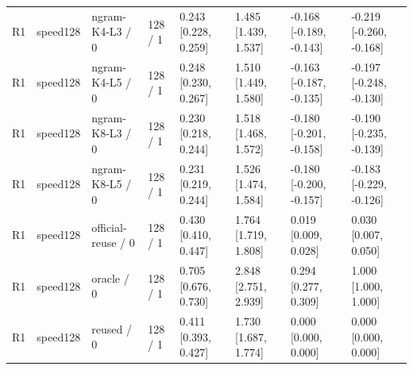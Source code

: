 \begin{tabular}{llllllll}
R1 & speed128 & ngram-K4-L3 / 0 & 128 / 1 & 0.243 [0.228, 0.259] & 1.485 [1.439, 1.537] & -0.168 [-0.189, -0.143] & -0.219 [-0.260, -0.168] \\
R1 & speed128 & ngram-K4-L5 / 0 & 128 / 1 & 0.248 [0.230, 0.267] & 1.510 [1.449, 1.580] & -0.163 [-0.187, -0.135] & -0.197 [-0.248, -0.130] \\
R1 & speed128 & ngram-K8-L3 / 0 & 128 / 1 & 0.230 [0.218, 0.244] & 1.518 [1.468, 1.572] & -0.180 [-0.201, -0.158] & -0.190 [-0.235, -0.139] \\
R1 & speed128 & ngram-K8-L5 / 0 & 128 / 1 & 0.231 [0.219, 0.244] & 1.526 [1.474, 1.584] & -0.180 [-0.200, -0.157] & -0.183 [-0.229, -0.126] \\
R1 & speed128 & official-reuse / 0 & 128 / 1 & 0.430 [0.410, 0.447] & 1.764 [1.719, 1.808] & 0.019 [0.009, 0.028] & 0.030 [0.007, 0.050] \\
R1 & speed128 & oracle / 0 & 128 / 1 & 0.705 [0.676, 0.730] & 2.848 [2.751, 2.939] & 0.294 [0.277, 0.309] & 1.000 [1.000, 1.000] \\
R1 & speed128 & reused / 0 & 128 / 1 & 0.411 [0.393, 0.427] & 1.730 [1.687, 1.774] & 0.000 [0.000, 0.000] & 0.000 [0.000, 0.000] \\
\hline
\end{tabular}

